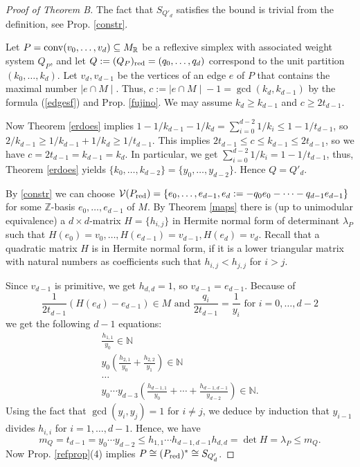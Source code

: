 \documentclass[a4paper,twoside]{article}
\newcommand{\card}[1]{{\mid\! #1 \!\mid}}
\def\N{{\mathbb N}}
\def\R{{\mathbb R}}
\def\Z{{\mathbb Z}}
\def\Pred{{P_{\rm red}}}
\def\V{{{\cal V}}}
\def\conv{{\rm conv}}
\def\MR{{M_{\R}}}
\begin{document}
\begin{proof}[Proof of Theorem B]

The fact that $S_{Q'_d}$ satisfies the bound is trivial from the definition, see Prop. \ref{constr}. 

Let $P = \conv(v_0, \ldots, v_d) 
\subseteq \MR$ be a reflexive simplex with associated weight system $Q_P$, and let $Q := (Q_P)_{{\rm red}} 
= (q_0, \ldots, q_d)$ correspond to the unit partition $(k_0, \ldots, k_d)$. Let $v_d,v_{d-1}$ be the vertices of an edge $e$ of $P$ 
that contains the maximal number $\card{e \cap M}$. Thus, $c := \card{e \cap M} - 1 = \gcd(k_d,k_{d-1})$ by the formula (\ref{edgesf}) 
and Prop. \ref{fujino}. We may assume $k_d \geq k_{d-1}$ and $c \geq 2 t_{d-1}$.

Now Theorem \ref{erdoes} implies 
$1 - 1/k_{d-1} - 1/k_d = \sum_{i=0}^{d-2} 1/k_i \leq 1 - 1/t_{d-1}$, so 
$2/k_{d-1} \geq 1/k_{d-1} + 1/k_d \geq 1/t_{d-1}$. This implies $2 t_{d-1} \leq c \leq k_{d-1} \leq 2 t_{d-1}$, so we have $c = 2 t_{d-1} =  k_{d-1} = k_d$. 
In particular, we get $\sum_{i=0}^{d-2} 1/k_i = 1 - 1/t_{d-1}$, thus, Theorem \ref{erdoes} 
yields $\{k_0, \ldots, k_{d-2}\} = \{y_0, \ldots, y_{d-2}\}$. Hence $Q = Q'_d$.

\smallskip

By \ref{constr} we can choose 
$\V(\Pred) = \{e_0, \ldots, e_{d-1}, e_d := -q_0 e_0 - \cdots -q_{d-1} e_{d-1}\}$ for some 
$\Z$-basis $e_0, \ldots, e_{d-1}$ of $M$. By Theorem \ref{maps} there is 
(up to unimodular equivalence) 
a $d \times d$-matrix $H = \{h_{i,j}\}$ in Hermite normal form of determinant $\lambda_P$ 
such that $H(e_0) = v_0,  \ldots, H(e_{d-1}) = v_{d-1}, 
H(e_d) = v_d$. 
Recall that a quadratic matrix $H$ is in Hermite normal form, if it is a lower triangular matrix with natural numbers as 
coefficients such that $h_{i,j} < h_{j,j}$ for $i > j$.

Since $v_{d-1}$ is primitive, we get $h_{d,d} = 1$, so $v_{d-1} = e_{d-1}$. 
Because of 
$$\frac{1}{2 t_{d-1}} (H(e_d) - e_{d-1}) \in M \text{ and } \frac{q_i}{2 t_{d-1}} = 
\frac{1}{y_i} \text{ for }i = 0, \ldots, d-2$$ 
we get the following $d-1$ equations:
\begin{eqnarray*}
\frac{h_{1,1}}{y_0} \in \N\\
y_0 (\frac{h_{2,1}}{y_0} + \frac{h_{2,2}}{y_1}) \in \N\\
\ldots\\
y_0 \cdots y_{d-3} (\frac{h_{d-1,1}}{y_0} + \cdots + \frac{h_{d-1,d-1}}{y_{d-2}}) \in \N.
\end{eqnarray*}
Using the fact that $\gcd(y_i,y_j) = 1$ for $i \not= j$, we deduce by induction that 
$y_{i-1}$ divides $h_{i,i}$ for $i = 1, \ldots, d-1$. Hence, we have
\[m_Q = t_{d-1} = y_0 \cdots y_{d-2} \leq h_{1,1} \cdots h_{d-1,d-1} h_{d,d} = \det H = \lambda_P \leq m_Q.\] 
Now Prop. \ref{refprop}(4) implies $P \cong (\Pred)^* \cong S_{Q'_d}$.

\end{proof}
\end{document}
